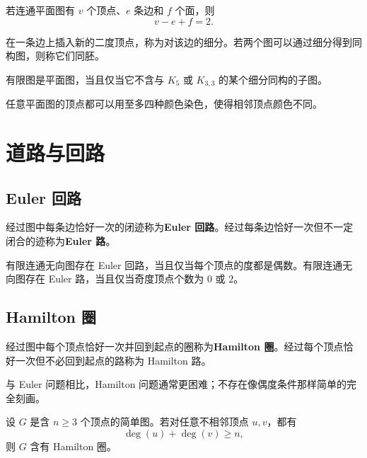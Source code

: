 \begin{theorem}[Euler 公式]
若连通平面图有 $v$ 个顶点、$e$ 条边和 $f$ 个面，则
\[
    v-e+f=2.
\]
\end{theorem}

\begin{definition}[图的细分]
在一条边上插入新的二度顶点，称为对该边的细分。若两个图可以通过细分得到同构图，则称它们同胚。
\end{definition}

\begin{theorem}[Kuratowski 定理]
有限图是平面图，当且仅当它不含与 $K_5$ 或 $K_{3,3}$ 的某个细分同构的子图。
\end{theorem}

\begin{theorem}[四色定理]
任意平面图的顶点都可以用至多四种颜色染色，使得相邻顶点颜色不同。
\end{theorem}

\section{道路与回路}

\subsection{Euler 回路}

\begin{definition}
经过图中每条边恰好一次的闭迹称为\textbf{Euler 回路}。经过每条边恰好一次但不一定闭合的迹称为\textbf{Euler 路}。
\end{definition}

\begin{theorem}
有限连通无向图存在 Euler 回路，当且仅当每个顶点的度都是偶数。有限连通无向图存在 Euler 路，当且仅当奇度顶点个数为 $0$ 或 $2$。
\end{theorem}

\subsection{Hamilton 圈}

\begin{definition}
经过图中每个顶点恰好一次并回到起点的圈称为\textbf{Hamilton 圈}。经过每个顶点恰好一次但不必回到起点的路称为 Hamilton 路。
\end{definition}

与 Euler 问题相比，Hamilton 问题通常更困难；不存在像偶度条件那样简单的完全刻画。

\begin{theorem}[Ore 定理]
设 $G$ 是含 $n\ge3$ 个顶点的简单图。若对任意不相邻顶点 $u,v$，都有
\[
    \deg(u)+\deg(v)\ge n,
\]
则 $G$ 含有 Hamilton 圈。
\end{theorem}

